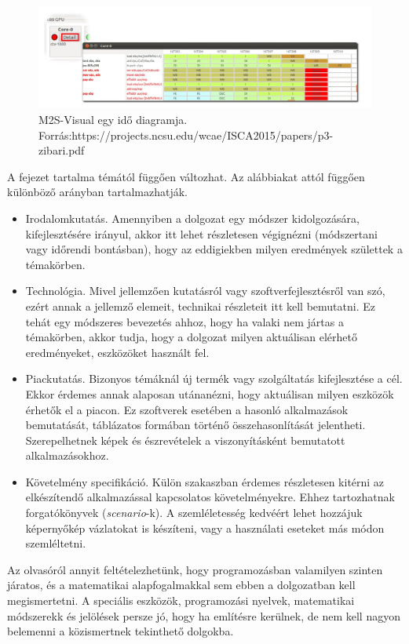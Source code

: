 \begin{figure}[h]
\centering
\includegraphics[scale=0.5]{images/m2sv2.jpg}
\caption{M2S-Visual egy idő diagramja. \\ Forrás:https://projects.ncsu.edu/wcae/ISCA2015/papers/p3-zibari.pdf}
\label{fig:m2sv}
\end{figure}


A fejezet tartalma témától függően változhat. Az alábbiakat attól függően különböző arányban tartalmazhatják.
\begin{itemize}
\item Irodalomkutatás. Amennyiben a dolgozat egy módszer kidolgozására, kifejlesztésére irányul, akkor itt lehet részletesen végignézni (módszertani vagy időrendi bontásban), hogy az eddigiekben milyen eredmények születtek a témakörben.
\item Technológia. Mivel jellemzően kutatásról vagy szoftverfejlesztésről van szó, ezért annak a jellemző elemeit, technikai részleteit itt kell bemutatni.
Ez tehát egy módszeres bevezetés ahhoz, hogy ha valaki nem jártas a témakörben, akkor tudja, hogy a dolgozat milyen aktuálisan elérhető eredményeket, eszközöket használt fel.
\item Piackutatás. Bizonyos témáknál új termék vagy szolgáltatás kifejlesztése a cél.
Ekkor érdemes annak alaposan utánanézni, hogy aktuálisan milyen eszközök érhetők el a piacon.
Ez szoftverek esetében a hasonló alkalmazások bemutatását, táblázatos formában történő összehasonlítását jelentheti.
Szerepelhetnek képek és észrevételek a viszonyításként bemutatott alkalmazásokhoz.
\item Követelmény specifikáció. Külön szakaszban érdemes részletesen kitérni az elkészítendő alkalmazással kapcsolatos követelményekre.
Ehhez tartozhatnak forgatókönyvek (\textit{scenario}-k).
A szemléletesség kedvéért lehet hozzájuk képernyőkép vázlatokat is készíteni, vagy a használati eseteket más módon szemléltetni.
\end{itemize}


Az olvasóról annyit feltételezhetünk, hogy programozásban valamilyen szinten járatos, és a matematikai alapfogalmakkal sem ebben a dolgozatban kell megismertetni.
A speciális eszközök, programozási nyelvek, matematikai módszerekk és jelölések persze jó, hogy ha említésre kerülnek, de nem kell nagyon belemenni a közismertnek tekinthető dolgokba.

